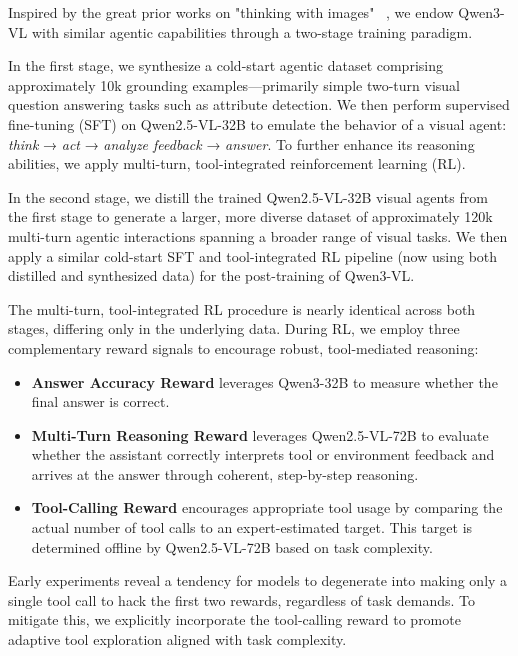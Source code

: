 \documentclass{article} %
\begin{document}
Inspired by the great prior works on "thinking with images" ~\citep{wu2025mmsearch, jin2025search, zheng2025deepeyes, lai2025mini}, we endow Qwen3-VL with similar agentic capabilities through a two-stage training paradigm.

In the first stage, we synthesize a cold-start agentic dataset comprising approximately 10k grounding examples—primarily simple two-turn visual question answering tasks such as attribute detection. We then perform supervised fine-tuning (SFT) on Qwen2.5-VL-32B to emulate the behavior of a visual agent: \textit{think} → \textit{act} → \textit{analyze feedback} → \textit{answer}. To further enhance its reasoning abilities, we apply multi-turn, tool-integrated reinforcement learning (RL). 

In the second stage, we distill the trained Qwen2.5-VL-32B visual agents from the first stage to generate a larger, more diverse dataset of approximately 120k multi-turn agentic interactions spanning a broader range of visual tasks. We then apply a similar cold-start SFT and tool-integrated RL pipeline (now using both distilled and synthesized data) for the post-training of Qwen3-VL.

The multi-turn, tool-integrated RL procedure is nearly identical across both stages, differing only in the underlying data. During RL, we employ three complementary reward signals to encourage robust, tool-mediated reasoning:

\begin{itemize}[itemindent=0pt, labelsep=4pt, leftmargin=*]
    \item \textbf{Answer Accuracy Reward} leverages Qwen3-32B to measure whether the final answer is correct.
    \item \textbf{Multi-Turn Reasoning Reward} leverages Qwen2.5-VL-72B to evaluate whether the assistant correctly interprets tool or environment feedback and arrives at the answer through coherent, step-by-step reasoning.
    \item \textbf{Tool-Calling Reward} encourages appropriate tool usage by comparing the actual number of tool calls to an expert-estimated target. This target is determined offline by Qwen2.5-VL-72B based on task complexity.
\end{itemize}

Early experiments reveal a tendency for models to degenerate into making only a single tool call to hack the first two rewards, regardless of task demands. To mitigate this, we explicitly incorporate the tool-calling reward to promote adaptive tool exploration aligned with task complexity.
\end{document}

